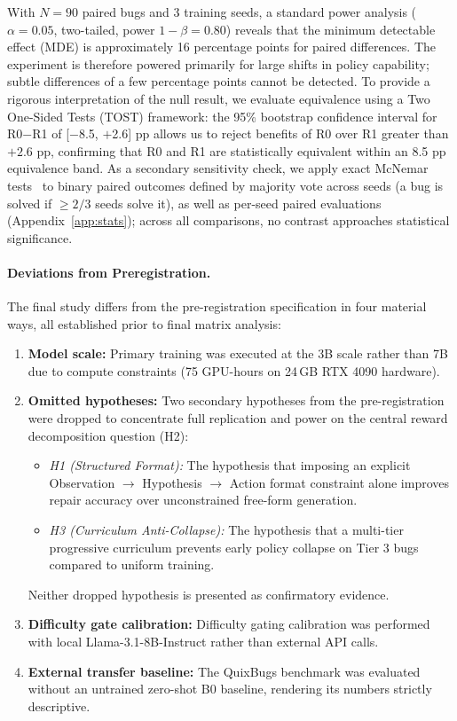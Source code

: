 \documentclass{article}
\begin{document}
With $N=90$ paired bugs and 3 training seeds, a standard power analysis ($\alpha=0.05$, two-tailed, power $1-\beta=0.80$) reveals that the minimum detectable effect (MDE) is approximately 16 percentage points for paired differences. The experiment is therefore powered primarily for large shifts in policy capability; subtle differences of a few percentage points cannot be detected. To provide a rigorous interpretation of the null result, we evaluate equivalence using a Two One-Sided Tests (TOST) framework: the 95\% bootstrap confidence interval for R0$-$R1 of [$-$8.5, $+$2.6] pp allows us to reject benefits of R0 over R1 greater than $+2.6$ pp, confirming that R0 and R1 are statistically equivalent within an 8.5 pp equivalence band. As a secondary sensitivity check, we apply exact McNemar tests~\cite{McNemar1947} to binary paired outcomes defined by majority vote across seeds (a bug is solved if $\ge 2/3$ seeds solve it), as well as per-seed paired evaluations (Appendix~\ref{app:stats}); across all comparisons, no contrast approaches statistical significance.

\paragraph{Deviations from Preregistration.}
The final study differs from the pre-registration specification in four material ways, all established prior to final matrix analysis:
\begin{enumerate}
\item \textbf{Model scale:} Primary training was executed at the 3B scale rather than 7B due to compute constraints (75 GPU-hours on 24\,GB RTX 4090 hardware).
\item \textbf{Omitted hypotheses:} Two secondary hypotheses from the pre-registration were dropped to concentrate full replication and power on the central reward decomposition question (H2):
\begin{itemize}
\item \textit{H1 (Structured Format):} The hypothesis that imposing an explicit Observation $\to$ Hypothesis $\to$ Action format constraint alone improves repair accuracy over unconstrained free-form generation.
\item \textit{H3 (Curriculum Anti-Collapse):} The hypothesis that a multi-tier progressive curriculum prevents early policy collapse on Tier 3 bugs compared to uniform training.
\end{itemize}
Neither dropped hypothesis is presented as confirmatory evidence.
\item \textbf{Difficulty gate calibration:} Difficulty gating calibration was performed with local Llama-3.1-8B-Instruct rather than external API calls.
\item \textbf{External transfer baseline:} The QuixBugs benchmark was evaluated without an untrained zero-shot B0 baseline, rendering its numbers strictly descriptive.
\end{enumerate}
\end{document}
